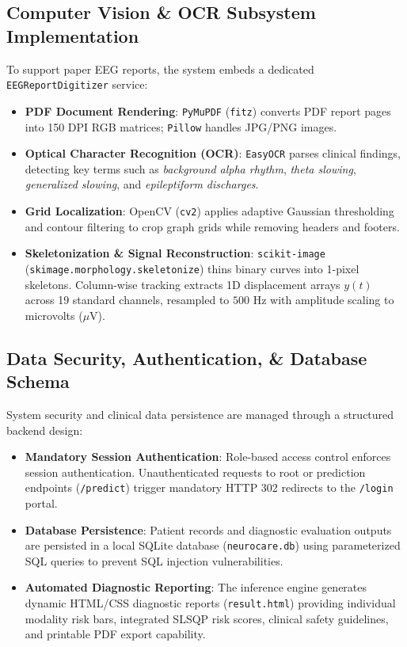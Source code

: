 \documentclass[conference]{IEEEtran}
\begin{document}
\subsection{Computer Vision \& OCR Subsystem Implementation}
To support paper EEG reports, the system embeds a dedicated \texttt{EEGReportDigitizer} service:
\begin{itemize}
    \item \textbf{PDF Document Rendering}: \texttt{PyMuPDF} (\texttt{fitz}) converts PDF report pages into 150 DPI RGB matrices; \texttt{Pillow} handles JPG/PNG images.
    \item \textbf{Optical Character Recognition (OCR)}: \texttt{EasyOCR} parses clinical findings, detecting key terms such as \textit{background alpha rhythm}, \textit{theta slowing}, \textit{generalized slowing}, and \textit{epileptiform discharges}.
    \item \textbf{Grid Localization}: OpenCV (\texttt{cv2}) applies adaptive Gaussian thresholding and contour filtering to crop graph grids while removing headers and footers.
    \item \textbf{Skeletonization \& Signal Reconstruction}: \texttt{scikit-image} (\texttt{skimage.morphology.skeletonize}) thins binary curves into 1-pixel skeletons. Column-wise tracking extracts 1D displacement arrays $y(t)$ across 19 standard channels, resampled to $500\text{ Hz}$ with amplitude scaling to microvolts ($\mu\text{V}$).
\end{itemize}

\subsection{Data Security, Authentication, \& Database Schema}
System security and clinical data persistence are managed through a structured backend design:
\begin{itemize}
    \item \textbf{Mandatory Session Authentication}: Role-based access control enforces session authentication. Unauthenticated requests to root or prediction endpoints (\texttt{/predict}) trigger mandatory HTTP 302 redirects to the \texttt{/login} portal.
    \item \textbf{Database Persistence}: Patient records and diagnostic evaluation outputs are persisted in a local SQLite database (\texttt{neurocare.db}) using parameterized SQL queries to prevent SQL injection vulnerabilities.
    \item \textbf{Automated Diagnostic Reporting}: The inference engine generates dynamic HTML/CSS diagnostic reports (\texttt{result.html}) providing individual modality risk bars, integrated SLSQP risk scores, clinical safety guidelines, and printable PDF export capability.
\end{itemize}
\end{document}
